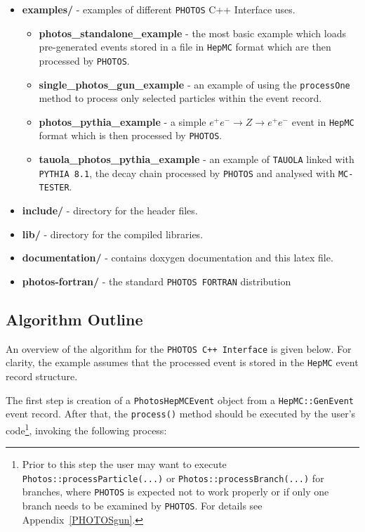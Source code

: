\documentclass[]{Photos_interface_design}
\begin{document}
\begin{itemize}
  \item {\bf examples/ } - examples of different {\tt PHOTOS} C++ Interface uses.
    \begin{itemize}
	\item {\bf photos\_standalone\_example} - the most basic example which loads pre-generated 
	      events stored in a file in {\tt HepMC} format which are then processed by {\tt PHOTOS}.
	\item {\bf single\_photos\_gun\_example} - an example of using the {\tt processOne} method
	      to process only selected particles within the event record.
    \item {\bf photos\_pythia\_example} - a simple $e^+e^- \rightarrow Z \rightarrow e^+e^-$ event in
	{\tt HepMC} format which is then processed by {\tt PHOTOS}.
    \item {\bf tauola\_photos\_pythia\_example } - an example of  {\tt TAUOLA} linked with {\tt PYTHIA 8.1},
	the decay chain processed by {\tt PHOTOS} and analysed with  {\tt MC-TESTER}.
    \end{itemize}   
  \item {\bf include/} - directory for the header files.
  \item {\bf lib/ } - directory for the compiled  libraries. 
  \item {\bf documentation/ } - contains doxygen documentation and this latex file.
  \item {\bf photos-fortran/ } - the  standard {\tt PHOTOS FORTRAN} distribution
\end{itemize}

\subsection{Algorithm Outline}
\label{sect:Outline}

An overview of the algorithm for  the {\tt PHOTOS C++ Interface} is
given below. For clarity, the example assumes that the processed event
is stored in the {\tt HepMC} event record structure.

The first step is creation of a {\tt PhotosHepMCEvent} object from
a {\tt HepMC::GenEvent} event record. After that, the {\tt process()} method should
be executed by the user's code\footnote{Prior to this step
the user may want to execute {\tt Photos::processParticle(...)} or {\tt Photos::processBranch(...)}
for branches, where {\tt PHOTOS} is expected not to work properly or if only one branch
needs to be examined by {\tt PHOTOS}. For details see Appendix~\ref{PHOTOSgun}.
}, invoking the following process:
\end{document}
